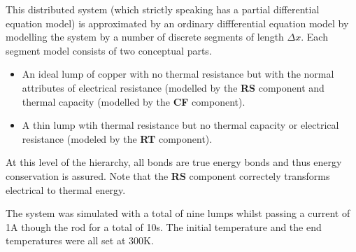  This distributed system (which strictly speaking has a partial
 differential equation model) is approximated by an ordinary
 diffferential equation model by modelling the system by a number of
 discrete segments of length $\Delta x$. Each segment model consists
 of two conceptual parts.
 \begin{itemize}
 \item An ideal lump of copper with no thermal resistance but with the
   normal attributes of electrical resistance (modelled by the
   \textbf{RS} component and thermal capacity (modelled by the
   \textbf{CF} component).
 \item A thin lump wtih thermal resistance but no thermal capacity or
   electrical resistance (modeled by the \textbf{RT} component).
 \end{itemize}
At this level of the hierarchy, all bonds are true energy bonds and
thus energy conservation is assured. Note that the \textbf{RS}
component correctely transforms electrical to thermal energy.

The system was simulated with a total of nine lumps whilst passing a
current of 1A though the rod for a total of 10s. The initial
temperature and the end temperatures were all set at 300K.
